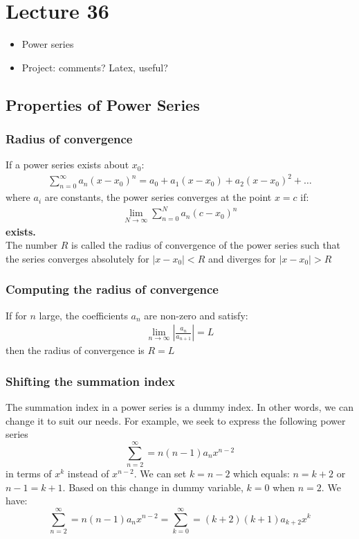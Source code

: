 
\chapter*{Lecture 36}

\begin{recall}{}{}
\begin{itemize}
\item Power series
\item Project: comments? Latex, useful?
\end{itemize}
\end{recall}

\section{Properties of Power Series}
\subsection{Radius of convergence}
If a power series exists about $x_0$:
\begin{align*}
\sum^\infty_{n=0}a_n(x-x_0)^n=a_0+a_1(x-x_0)+a_2(x-x_0)^2 + \hdots
\end{align*}
where $a_i$ are constants, the power series converges at the point $x=c$ if:
\begin{align*}
\lim_{N\rightarrow\infty}\sum^N_{n=0} a_n(c-x_0)^n
\end{align*}
\textbf{exists.}\\
The number $R$ is called the radius of convergence of the power series such that the series converges absolutely for $\left|x-x_0\right|<R$ and diverges for $\left|x-x_0\right|>R$
\subsection{Computing the radius of convergence}
If for $n$ large, the coefficients $a_n$ are non-zero and satisfy:
\begin{align*}
\lim_{n\rightarrow\infty}\left|\frac{a_n}{a_{n+1}}\right|=L
\end{align*}
then the radius of convergence is $R=L$

\subsection{Shifting the summation index}
The summation index in a power series is a dummy index. In other words, we can change it to suit our needs.
For example, we seek to express the following power series 
\begin{equation*}
\sum^\infty_{n=2}=n(n-1)a_nx^{n-2}
\end{equation*}
in terms of $x^k$ instead of $x^{n-2}$. We can set $k=n-2$ which equals: $n=k+2$ or $n-1=k+1$. Based on this change in dummy variable, $k=0$ when $n=2$. We have:  
\begin{equation*}
\sum^\infty_{n=2}=n(n-1)a_nx^{n-2}=\sum^\infty_{k=0}=(k+2)(k+1)a_{k+2}x^{k}
\end{equation*}


